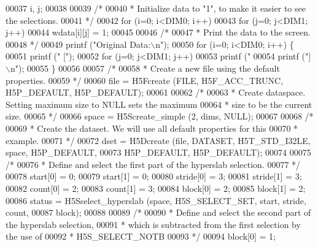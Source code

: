 \begin{DoxyCode}
00037                 i, j;
00038 
00039     \textcolor{comment}{/*}
00040 \textcolor{comment}{     * Initialize data to "1", to make it easier to see the selections.}
00041 \textcolor{comment}{     */}
00042     \textcolor{keywordflow}{for} (i=0; i<DIM0; i++)
00043         \textcolor{keywordflow}{for} (j=0; j<DIM1; j++)
00044             wdata[i][j] = 1;
00045 
00046     \textcolor{comment}{/*}
00047 \textcolor{comment}{     * Print the data to the screen.}
00048 \textcolor{comment}{     */}
00049     printf (\textcolor{stringliteral}{"Original Data:\(\backslash\)n"});
00050     \textcolor{keywordflow}{for} (i=0; i<DIM0; i++) \{
00051         printf (\textcolor{stringliteral}{" ["});
00052         \textcolor{keywordflow}{for} (j=0; j<DIM1; j++)
00053             printf (\textcolor{stringliteral}{" %
00054         printf (\textcolor{stringliteral}{"]\(\backslash\)n"});
00055     \}
00056 
00057     \textcolor{comment}{/*}
00058 \textcolor{comment}{     * Create a new file using the default properties.}
00059 \textcolor{comment}{     */}
00060     file = H5Fcreate (FILE, H5F\_ACC\_TRUNC, H5P\_DEFAULT, H5P\_DEFAULT);
00061 
00062     \textcolor{comment}{/*}
00063 \textcolor{comment}{     * Create dataspace.  Setting maximum size to NULL sets the maximum}
00064 \textcolor{comment}{     * size to be the current size.}
00065 \textcolor{comment}{     */}
00066     space = H5Screate\_simple (2, dims, NULL);
00067 
00068     \textcolor{comment}{/*}
00069 \textcolor{comment}{     * Create the dataset.  We will use all default properties for this}
00070 \textcolor{comment}{     * example.}
00071 \textcolor{comment}{     */}
00072     dset = H5Dcreate (file, DATASET, H5T\_STD\_I32LE, space, H5P\_DEFAULT,
00073                 H5P\_DEFAULT, H5P\_DEFAULT);
00074 
00075     \textcolor{comment}{/*}
00076 \textcolor{comment}{     * Define and select the first part of the hyperslab selection.}
00077 \textcolor{comment}{     */}
00078     start[0] = 0;
00079     start[1] = 0;
00080     stride[0] = 3;
00081     stride[1] = 3;
00082     count[0] = 2;
00083     count[1] = 3;
00084     block[0] = 2;
00085     block[1] = 2;
00086     status = H5Sselect\_hyperslab (space, H5S\_SELECT\_SET, start, stride, count,
00087                 block);
00088 
00089     \textcolor{comment}{/*}
00090 \textcolor{comment}{     * Define and select the second part of the hyperslab selection,}
00091 \textcolor{comment}{     * which is subtracted from the first selection by the use of}
00092 \textcolor{comment}{     * H5S\_SELECT\_NOTB}
00093 \textcolor{comment}{     */}
00094     block[0] = 1;
}
\end{DoxyCode}

